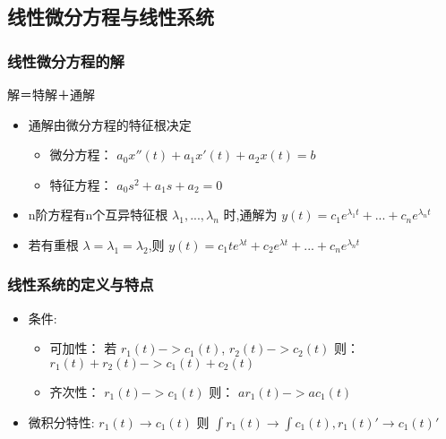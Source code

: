 \documentclass{article}
\begin{document}
\subsection{线性微分方程与线性系统}
\label{sec-1-2}
\begin{frame}
\frametitle{线性微分方程的解}
\label{sec-1-2-1}

   解＝特解＋通解

\begin{itemize}
\item <2->通解由微分方程的特征根决定
\begin{itemize}
\item <3->微分方程： $a_0 x''(t)+a_1 x'(t)+a_2 x(t) =b$
\item <4->特征方程：  $a_0s^2+a_1 s + a_2=0$
\end{itemize}
\item <5-> n阶方程有n个互异特征根 $\lambda_1,...,\lambda_n$ 时,通解为
      $y(t)=c_1e^{\lambda_1 t}+...+c_ne^{\lambda_n t}$
\item <6-> 若有重根  $\lambda=\lambda_1=\lambda_2$,则
      $y(t)=c_1 t e^{\lambda t}+c_2e^{\lambda t}+...+c_ne^{\lambda_n t}$
\end{itemize}
\end{frame}
\begin{frame}
\frametitle{线性系统的定义与特点}
\label{sec-1-2-2}

\begin{itemize}
\item <2->条件:
\begin{itemize}
\item 可加性： 若 $r_1(t)->c_1(t)$, $r_2(t)->c_2(t)$ 则： $r_1(t)+r_2(t)->c_1(t)+c_2(t)$
\item 齐次性： $r_1(t)->c_1(t)$ 则： $a r_1(t) -> a c_1(t)$
\end{itemize}
\item <3-> 微积分特性: $r_1(t)\rightarrow c_1(t)$  则  $\int r_1(t) \rightarrow \int c_1(t), r_1(t)'\rightarrow c_1(t)'$
\end{itemize}
\end{frame}
\end{document}
